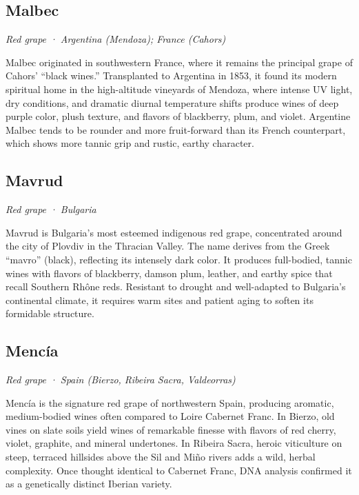 \subsection*{Malbec}
\textit{Red grape · Argentina (Mendoza); France (Cahors)}\par\smallskip

Malbec originated in southwestern France, where it remains the principal grape of Cahors’ “black wines.” Transplanted to Argentina in 1853, it found its modern spiritual home in the high-altitude vineyards of Mendoza, where intense UV light, dry conditions, and dramatic diurnal temperature shifts produce wines of deep purple color, plush texture, and flavors of blackberry, plum, and violet. Argentine Malbec tends to be rounder and more fruit-forward than its French counterpart, which shows more tannic grip and rustic, earthy character.

\subsection*{Mavrud}
\textit{Red grape · Bulgaria}\par\smallskip

Mavrud is Bulgaria’s most esteemed indigenous red grape, concentrated around the city of Plovdiv in the Thracian Valley. The name derives from the Greek “mavro” (black), reflecting its intensely dark color. It produces full-bodied, tannic wines with flavors of blackberry, damson plum, leather, and earthy spice that recall Southern Rhône reds. Resistant to drought and well-adapted to Bulgaria’s continental climate, it requires warm sites and patient aging to soften its formidable structure.

\subsection*{Mencía}
\textit{Red grape · Spain (Bierzo, Ribeira Sacra, Valdeorras)}\par\smallskip

Mencía is the signature red grape of northwestern Spain, producing aromatic, medium-bodied wines often compared to Loire Cabernet Franc. In Bierzo, old vines on slate soils yield wines of remarkable finesse with flavors of red cherry, violet, graphite, and mineral undertones. In Ribeira Sacra, heroic viticulture on steep, terraced hillsides above the Sil and Miño rivers adds a wild, herbal complexity. Once thought identical to Cabernet Franc, DNA analysis confirmed it as a genetically distinct Iberian variety.

